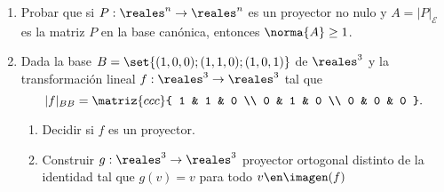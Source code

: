 \begin{enunciado}{\ejExtra} 
  \begin{enumerate}[label=\alph*)]
    \item Probar que si $P : \reales^n \to \reales^n$ es un proyector no nulo y $A = |P|_{\mathcal{E}}$ es la
          matriz $P$ en la base canónica, entonces $\norma{A} \geq 1$.

    \item Dada la base $B = \set{(1,0,0);(1,1,0);(1,0,1)}$ de $\reales^3$ y la transformación lineal $f: \reales^3 \to \reales^3$
          tal que
          $$
            |f|_{BB} =
            \matriz{ccc}{
              1 & 1 & 0 \\
              0 & 1 & 0 \\
              0 & 0 & 0
            }.
          $$
          \begin{enumerate}[label=\roman*)]
            \item Decidir si $f$ es un proyector.
            \item Construir $g: \reales^3 \to \reales^3$ proyector ortogonal distinto de la identidad tal que
                  $g(v) = v$ para todo $v \en \imagen(f)$
          \end{enumerate}
  \end{enumerate}
\end{enunciado}

